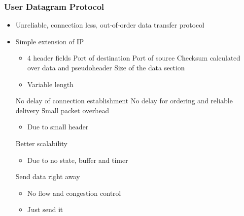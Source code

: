 \subsubsection{User Datagram Protocol}
\begin{itemize}
    \item Unreliable, connection less, out-of-order data transfer protocol
    \item Simple extension of IP
        \begin{itemize}
            \item $4$ header fields
             Port of destination
             Port of source
             Checksum calculated over data and pseudoheader
             Size of the data section
        \end{itemize}
        \begin{itemize}
            \item Variable length
        \end{itemize}
    \ipro No delay of connection establishment
    \ipro No delay for ordering and reliable delivery
    \ipro Small packet overhead
        \begin{itemize}
            \item Due to small header
        \end{itemize}
    \ipro Better scalability
        \begin{itemize}
            \item Due to no state, buffer and timer
        \end{itemize}
    \ipro Send data right away
        \begin{itemize}
            \item No flow and congestion control
            \item Just send it
        \end{itemize}
\end{itemize}

